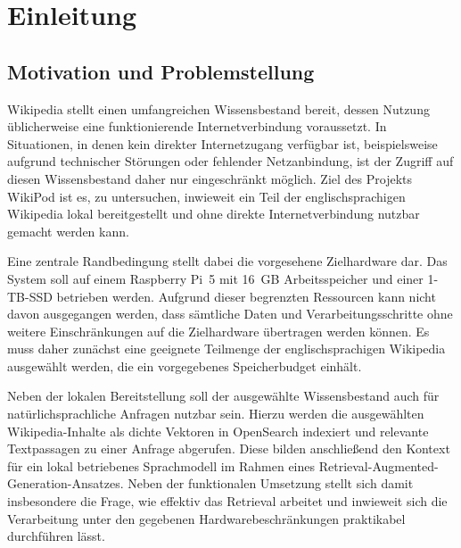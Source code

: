\chapter{Einleitung}
\label{ch:einleitung}

\section{Motivation und Problemstellung}

Wikipedia stellt einen umfangreichen Wissensbestand bereit, dessen Nutzung
üblicherweise eine funktionierende Internetverbindung voraussetzt. In
Situationen, in denen kein direkter Internetzugang verfügbar ist, beispielsweise
aufgrund technischer Störungen oder fehlender Netzanbindung, ist der Zugriff auf
diesen Wissensbestand daher nur eingeschränkt möglich. Ziel des Projekts WikiPod
ist es, zu untersuchen, inwieweit ein Teil der englischsprachigen Wikipedia
lokal bereitgestellt und ohne direkte Internetverbindung nutzbar gemacht werden
kann.

Eine zentrale Randbedingung stellt dabei die vorgesehene Zielhardware dar. Das
System soll auf einem Raspberry Pi~5 mit 16~GB Arbeitsspeicher und einer
1-TB-SSD betrieben werden. Aufgrund dieser begrenzten Ressourcen kann nicht
davon ausgegangen werden, dass sämtliche Daten und Verarbeitungsschritte ohne
weitere Einschränkungen auf die Zielhardware übertragen werden können. Es muss
daher zunächst eine geeignete Teilmenge der englischsprachigen Wikipedia
ausgewählt werden, die ein vorgegebenes Speicherbudget einhält.

Neben der lokalen Bereitstellung soll der ausgewählte Wissensbestand auch für
natürlichsprachliche Anfragen nutzbar sein. Hierzu werden die ausgewählten
Wikipedia-Inhalte als dichte Vektoren in OpenSearch indexiert und relevante
Textpassagen zu einer Anfrage abgerufen. Diese bilden anschließend den Kontext
für ein lokal betriebenes Sprachmodell im Rahmen eines
Retrieval-Augmented-Generation-Ansatzes. Neben der funktionalen Umsetzung stellt
sich damit insbesondere die Frage, wie effektiv das Retrieval arbeitet und
inwieweit sich die Verarbeitung unter den gegebenen Hardwarebeschränkungen
praktikabel durchführen lässt.

